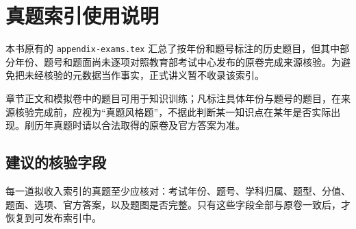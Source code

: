 \chapter{真题索引使用说明}

本书原有的 \texttt{appendix-exams.tex} 汇总了按年份和题号标注的历史题目，但其中部分年份、题号和题面尚未逐项对照教育部考试中心发布的原卷完成来源核验。为避免把未经核验的元数据当作事实，正式讲义暂不收录该索引。

\begin{attention}
章节正文和模拟卷中的题目可用于知识训练；凡标注具体年份与题号的题目，在来源核验完成前，应视为“真题风格题”，不据此判断某一知识点在某年是否实际出现。刷历年真题时请以合法取得的原卷及官方答案为准。
\end{attention}

\section*{建议的核验字段}

每一道拟收入索引的真题至少应核对：考试年份、题号、学科归属、题型、分值、题面、选项、官方答案，以及题图是否完整。只有这些字段全部与原卷一致后，才恢复到可发布索引中。
